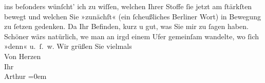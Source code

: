 \begin{ledgroupsized}[t]{13cm}
               ins beſonders wünſcht’ ich zu wiſſen, welchen Ihrer Stoffe ſie jetzt am ſtärkſten
               bewegt und welchen Sie »zunächſt« (ein ſcheußliches Berliner Wort) in Bewegung zu ſetzen gedenken. Da{\geminationn} Ihr Befinden, kurz u gut, was Sie mir \introOben{}zu\introOben{}
               ſagen haben. Schöner wärs natürlich, we{\geminationn}{ }{\pb}man an irgd einem Ufer gemeinſam wandelte,
               wo ſich »denn« u. ſ. w. \pend
           \pstart
           Wir grüßen Sie vielmals {\\[\baselineskip]}Von Herzen {\\[\baselineskip]}Ihr {\\[\baselineskip]}\spacefill\mbox{Arthur}\pend
           \leftskip=0em{}
         
         \endnumbering{}\end{ledgroupsized}\begin{anhang}\end{anhang}\newcommand{\dateiname}{L03009}\newcommand{\titel}{Arthur Schnitzler an Felix Salten, 5. 8. 1907}\newcommand{\editorInnen}{Martin Anton Müller und Laura Untner}
      